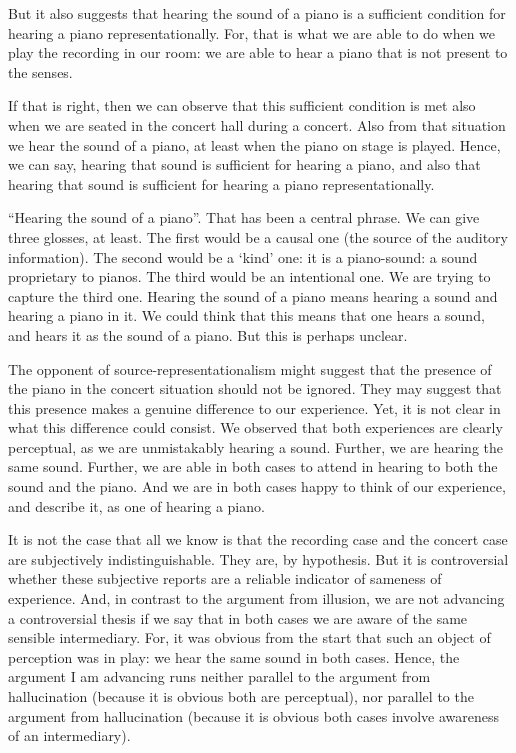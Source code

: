 \documentclass[sloppy, journal, git, bytitle, dodraft]{humapap}
\begin{document}
But it also suggests that hearing the sound of a piano is a sufficient condition for hearing a piano representationally. For, that is what we are able to do when we play the recording in our room: we are able to hear a piano that is not present to the senses. 

If that is right, then we can observe that this sufficient condition is met also when we are seated in the concert hall during a concert. Also from that situation we hear the sound of a piano, at least when the piano on stage is played. Hence, we can say, hearing that sound is sufficient for hearing a piano, and also that hearing that sound is sufficient for hearing a piano representationally. 

``Hearing the sound of a piano''. That has been a central phrase. We can give three glosses, at least. The first would be a causal one (the source of the auditory information). The second would be a `kind' one: it is a piano-sound: a sound proprietary to pianos. The third would be an intentional one. We are trying to capture the third one. Hearing the sound of a piano means hearing a sound and hearing a piano in it. We could think that this means that one hears a sound, and hears it as the sound of a piano. But this is perhaps unclear. 

The opponent of source-representationalism might suggest that the presence of the piano in the concert situation should not be ignored. They may suggest that this presence makes a genuine difference to our experience. Yet, it is not clear in what this difference could consist. We observed that both experiences are clearly perceptual, as we are unmistakably hearing a sound. Further, we are hearing the same sound. Further, we are able in both cases to attend in hearing to both the sound and the piano. And we are in both cases happy to think of our experience, and describe it, as one of hearing a piano. 

It is not the case that all we know is that the recording case and the concert case are subjectively indistinguishable. They are, by hypothesis. But it is controversial whether these subjective reports are a reliable indicator of sameness of experience. And, in contrast to the argument from illusion, we are not advancing a controversial thesis if we say that in both cases we are aware of the same sensible intermediary. For, it was obvious from the start that such an object of perception was in play: we hear the same sound in both cases. Hence, the argument I am advancing runs neither parallel to the argument from hallucination (because it is obvious both are perceptual), nor parallel to the argument from hallucination (because it is obvious both cases involve awareness of an intermediary). 
\end{document}

